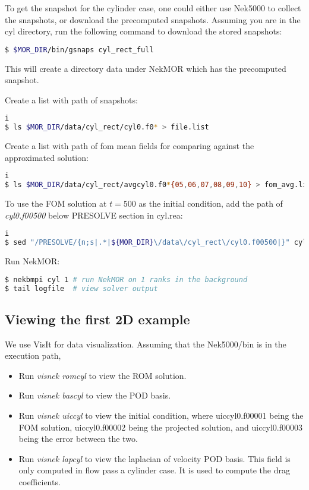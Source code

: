 To get the snapshot for the cylinder case, one could either use Nek5000 to
collect the snapshots, or download the precomputed snapshots. Assuming you are
in the cyl directory, run the following command to download the stored
snapshots: 
\begin{lstlisting}[language=bash] 
$ $MOR_DIR/bin/gsnaps cyl_rect_full 
\end{lstlisting}
This will create a directory data under NekMOR which has the precomputed
snapshot. 

Create a list with path of snapshots:
\begin{lstlisting}[language=bash] i
$ ls $MOR_DIR/data/cyl_rect/cyl0.f0* > file.list
\end{lstlisting}
Create a list with path of fom mean fields for comparing against the
approximated solution:
\begin{lstlisting}[language=bash] i
$ ls $MOR_DIR/data/cyl_rect/avgcyl0.f0*{05,06,07,08,09,10} > fom_avg.list
\end{lstlisting} 
To use the FOM solution at $t=500$ as the initial condition, add
the path of \textit{cyl0.f00500} below PRESOLVE section in cyl.rea:
\begin{lstlisting}[language=bash] i
$ sed "/PRESOLVE/{n;s|.*|${MOR_DIR}\/data\/cyl_rect\/cyl0.f00500|}" cyl.rea
\end{lstlisting}
Run NekMOR:
\begin{lstlisting}[language=bash] 
$ nekbmpi cyl 1 # run NekMOR on 1 ranks in the background 
$ tail logfile  # view solver output 
\end{lstlisting}

\subsection{Viewing the first 2D example}
We use VisIt for data visualization. Assuming that the Nek5000/bin is in the
execution path,  
\begin{itemize}
   \item Run \textit{visnek romcyl} to view the ROM solution.
   \item Run \textit{visnek bascyl} to view the POD basis.
   \item Run \textit{visnek uiccyl} to view the initial condition, where
      uiccyl0.f00001 being the FOM solution, uiccyl0.f00002 being the projected
      solution, and uiccyl0.f00003 being the error between the two.
   \item Run \textit{visnek lapcyl} to view the laplacian of velocity POD
      basis. This field is only computed in flow pass a cylinder case. It is
      used to compute the drag coefficients.
\end{itemize}

